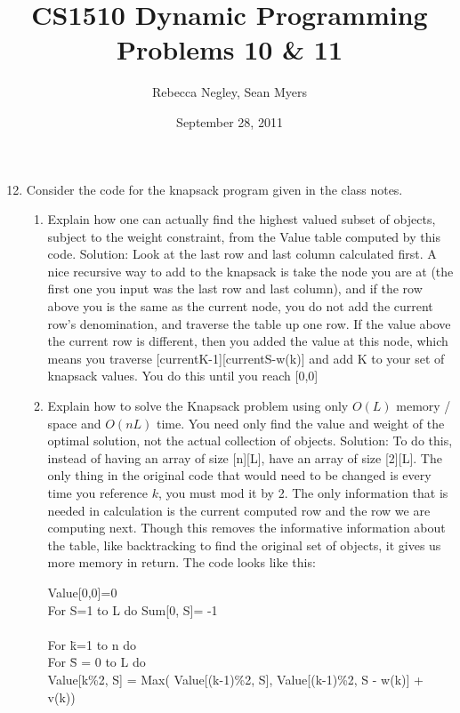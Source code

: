 \documentclass{article}
\title{CS1510  Dynamic Programming Problems 10 \& 11}
\author{Rebecca Negley, Sean Myers}
\date{September 28, 2011}
\begin{document}
\maketitle

\begin{enumerate}
\setcounter{enumi}{11}


\item Consider the code for the knapsack program given in the class notes.
\begin{enumerate}
	\item Explain how one can actually find the highest valued subset of objects, subject to the weight
\newline constraint, from the Value table computed by this code.
\newline
\newline Solution: Look at the last row and last column calculated first. A nice recursive way to add to the knapsack is take the node you are at (the first one you input was the last row and last column), and if the row above you is the same as the current node, you do not add the current row's denomination, and traverse the table up one row. If the value above the current row is different, then you added the value at this node, which means you traverse [currentK-1][currentS-w(k)] and add K to your set of knapsack values. You do this until you reach [0,0]
\newline

	\item Explain how to solve the Knapsack problem using only $O(L)$ memory / space and $O(nL)$ time. You need only find the value and weight of the optimal solution, not the actual collection of objects.
\newline
\newline Solution: To do this, instead of having an array of size [n][L], have an array of size [2][L]. The only thing in the original code that would need to be changed is every time you reference $k$, you must mod it by 2. The only information that is needed in calculation is the current computed row and the row we are computing next. Though this removes the informative information about the table, like backtracking to find the original set of objects, it gives us more memory in return.
The code looks like this:

\begin{tabbing}
Value[0,0]=0\\
For S=1 to L do Sum[0, S]= -1\\
\\
For \=k=1 to n do\\
\>	For \=S = 0 to L do\\
\>\>	Value[k\%2, S] = Max( Value[(k-1)\%2, S], Value[(k-1)\%2, S - w(k)] + v(k))\\


\end{tabbing}
\end{enumerate}
\end{enumerate}
\end{document}

